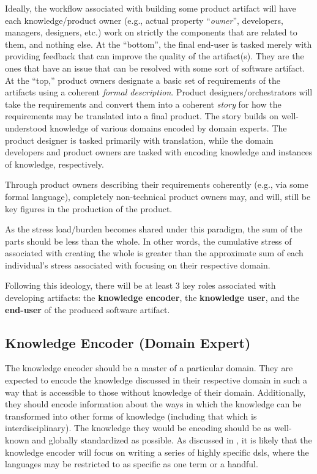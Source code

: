 Ideally, the workflow associated with building some product artifact will have
each knowledge/product owner (e.g., actual property ``\textit{owner}'',
developers, managers, designers, etc.) work on strictly the components that are
related to them, and nothing else. At the ``bottom'', the final end-user is
tasked merely with providing feedback that can improve the quality of the
artifact(s). They are the ones that have an issue that can be resolved with some
sort of software artifact. At the ``top,'' product owners designate a basic set
of requirements of the artifacts using a coherent \textit{formal description}.
Product designers/orchestrators will take the requirements and convert them into
a coherent \textit{story} for how the requirements may be translated into a
final product. The story builds on well-understood knowledge of various domains
encoded by domain experts. The product designer is tasked primarily with
translation, while the domain developers and product owners are tasked with
encoding knowledge and instances of knowledge, respectively.

Through product owners describing their requirements coherently (e.g., via some
formal language), completely non-technical product owners may, and will, still
be key figures in the production of the product.

As the stress load/burden becomes shared under this paradigm, the sum of the
parts should be less than the whole. In other words, the cumulative stress of
associated with creating the whole is greater than the approximate sum of each
individual's stress associated with focusing on their respective domain.

Following this ideology, there will be at least 3 key roles associated with
developing artifacts: the \textbf{knowledge encoder}, the \textbf{knowledge
user}, and the \textbf{end-user} of the produced software artifact.

\subsection{Knowledge Encoder (Domain Expert)}
\label{chap:ideology:sec:a_prospective_workflow:subsec:knowledge_encoder}

The knowledge encoder should be a master of a particular domain. They are
expected to encode the knowledge discussed in their respective domain in such a
way that is accessible to those without knowledge of their domain. Additionally,
they should encode information about the ways in which the knowledge can be
transformed into other forms of knowledge (including that which is
interdisciplinary). The knowledge they would be encoding should be as well-known
and globally standardized as possible. As discussed in
, it is
likely that the knowledge encoder will focus on writing a series of highly
specific \acsp{dsl}, where the languages may be restricted to as specific as one
term or a handful.

